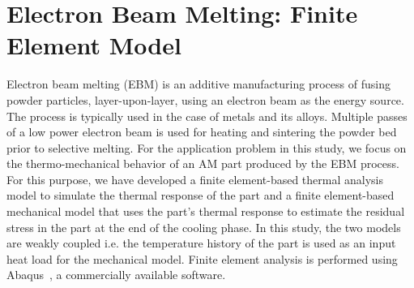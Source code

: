 \section{Electron Beam Melting: Finite Element Model}
\label{sec:model}

Electron beam melting (EBM) is an additive manufacturing process of fusing powder particles, layer-upon-layer, 
using an electron beam as the energy source. The process is typically used in the case of metals and its alloys.
Multiple passes of  a low power electron beam is used for heating and sintering the powder bed prior to selective
melting. For the application problem in this study, we focus on the thermo-mechanical behavior of an AM part
produced by the EBM process. For this purpose, we have developed a finite element-based thermal analysis
model to simulate the thermal response of the part and a finite element-based mechanical model that uses
the part's thermal
response to estimate the residual stress in the part at the end of the cooling phase. In this study, the two models are
weakly coupled i.e. the temperature history of the part is used as an input heat load for the mechanical model. 
Finite element analysis is performed using Abaqus~\cite{Hibbitt:2001}, a commercially available software. 

